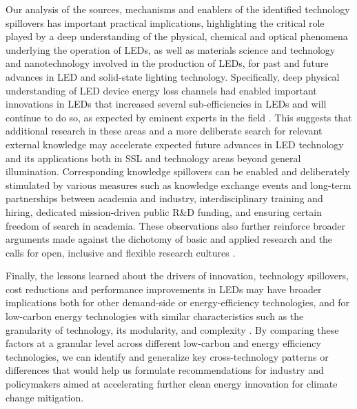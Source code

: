 \documentclass[parskip=full]{article}
\begin{document}
Our analysis of the sources, mechanisms and enablers of the identified technology spillovers has important practical implications, highlighting the critical role played by a deep understanding of the physical, chemical and optical phenomena underlying the operation of LEDs, as well as materials science and technology and nanotechnology involved in the production of LEDs, for past and future advances in LED and solid-state lighting technology. Specifically, deep physical understanding of LED device energy loss channels had enabled important innovations in LEDs that increased several sub-efficiencies in LEDs and will continue to do so, as expected by eminent experts in the field . This suggests that additional research in these areas and a more deliberate search for relevant external knowledge may accelerate expected future advances in LED technology and its applications both in SSL and technology areas beyond general illumination. Corresponding knowledge spillovers can be enabled and deliberately stimulated by various measures such as knowledge exchange events and long-term partnerships between academia and industry, interdisciplinary training and hiring, dedicated mission-driven public R\&D funding, and ensuring certain freedom of search in academia. These observations also further reinforce broader arguments made against the dichotomy of basic and applied research \cite{narayanamurti2016cycles, narayanamurti2021genesis} and the calls for open, inclusive and flexible research cultures \cite{Stephan2021}.

Finally, the lessons learned about the drivers of innovation, technology spillovers, cost reductions and performance improvements in LEDs may have broader implications both for other demand-side or energy-efficiency technologies, and for low-carbon energy technologies with similar characteristics such as the granularity of technology, its modularity, and complexity \cite{malhotra2020accelerating, Wilson2012}. By comparing these factors at a granular level across different low-carbon and energy efficiency technologies, we can identify and generalize key cross-technology patterns or differences that would help us formulate recommendations for industry and policymakers aimed at accelerating further clean energy innovation for climate change mitigation.
\end{document}
